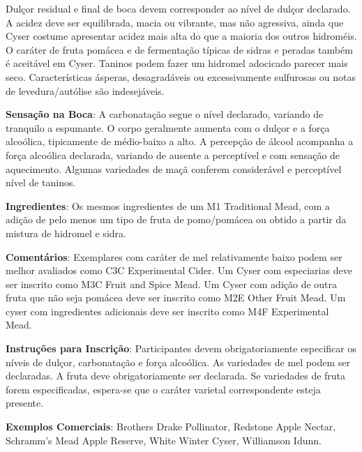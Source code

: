 Dulçor residual e final de boca devem corresponder ao nível de dulçor declarado. A acidez deve ser equilibrada, macia ou vibrante, mas não agressiva, ainda que Cyser costume apresentar acidez mais alta do que a maioria dos outros hidroméis. O caráter de fruta pomácea e de fermentação típicas de sidras e peradas também é aceitável em Cyser. Taninos podem fazer um hidromel adocicado parecer mais seco. Características ásperas, desagradáveis ou excessivamente sulfurosas ou notas de levedura/autólise são indesejáveis.

\textbf{Sensação na Boca}: A carbonatação segue o nível declarado, variando de tranquilo a espumante. O corpo geralmente aumenta com o dulçor e a força alcoólica, tipicamente de médio-baixo a alto. A percepção de álcool acompanha a força alcoólica declarada, variando de ausente a perceptível e com sensação de aquecimento. Algumas variedades de maçã conferem considerável e perceptível nível de taninos.

\textbf{Ingredientes}: Os mesmos ingredientes de um M1 Traditional Mead, com a adição de pelo menos um tipo de fruta de pomo/pomácea ou obtido a partir da mistura de hidromel e sidra.

\textbf{Comentários}: Exemplares com caráter de mel relativamente baixo podem ser melhor avaliados como C3C Experimental Cider. Um Cyser com especiarias deve ser inscrito como M3C Fruit and Spice Mead. Um Cyser com adição de outra fruta que não seja pomácea deve ser inscrito como M2E Other Fruit Mead. Um cyser com ingredientes adicionais deve ser inscrito como M4F Experimental Mead.

\textbf{Instruções para Inscrição}: Participantes devem obrigatoriamente especificar os níveis de dulçor, carbonatação e força alcoólica. As variedades de mel podem ser declaradas. A fruta deve obrigatoriamente ser declarada. Se variedades de fruta forem especificadas, espera-se que o caráter varietal correspondente esteja presente.

\textbf{Exemplos Comerciais}: Brothers Drake Pollinator, Redstone Apple Nectar, Schramm's Mead Apple Reserve, White Winter Cyser, Williamson Idunn.
